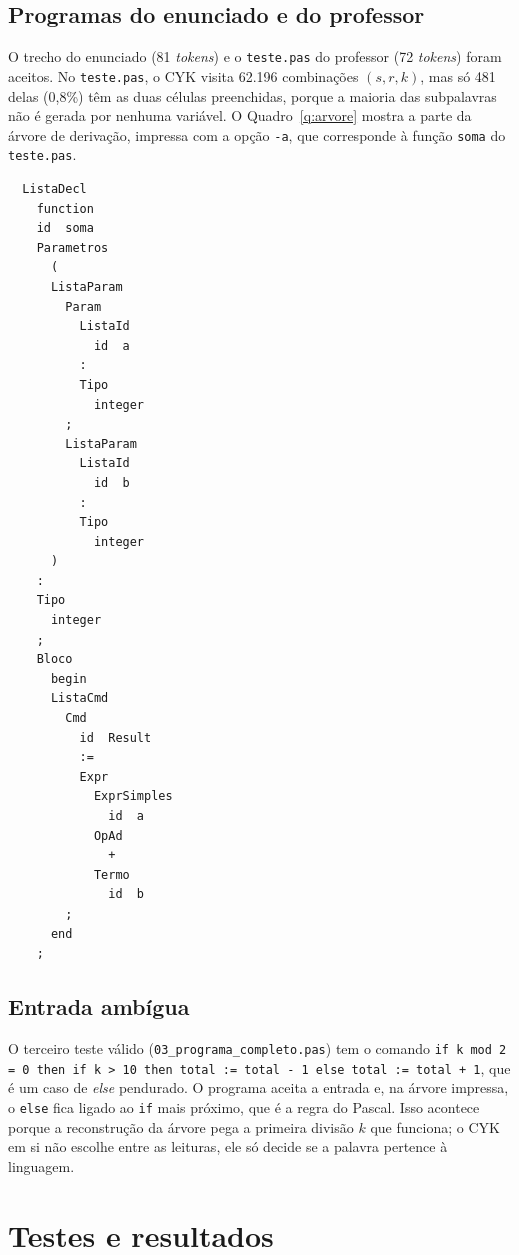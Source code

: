 \documentclass[12pt,a4paper]{article}
\newcommand{\fonte}[1][Elaborado pelos autores (2026).]{%
  \par\vspace{3pt}{\footnotesize Fonte: #1}\par}
\newcommand{\code}[1]{\texttt{#1}}
\begin{document}
\subsection{Programas do enunciado e do professor}

O trecho do enunciado (81 \textit{tokens}) e o \code{teste.pas} do professor (72
\textit{tokens}) foram aceitos. No \code{teste.pas}, o CYK visita 62.196 combinações
$(s, r, k)$, mas só 481 delas (0,8\%) têm as duas células preenchidas, porque a maioria das
subpalavras não é gerada por nenhuma variável. O Quadro~\ref{q:arvore} mostra a parte da árvore
de derivação, impressa com a opção \code{-a}, que corresponde à função \code{soma} do
\code{teste.pas}.

\begin{quadro}[htbp]
\caption{Árvore de derivação da função \code{soma} do \code{teste.pas} (opção \code{-a})}\label{q:arvore}
\begin{lstlisting}
  ListaDecl
    function
    id  soma
    Parametros
      (
      ListaParam
        Param
          ListaId
            id  a
          :
          Tipo
            integer
        ;
        ListaParam
          ListaId
            id  b
          :
          Tipo
            integer
      )
    :
    Tipo
      integer
    ;
    Bloco
      begin
      ListaCmd
        Cmd
          id  Result
          :=
          Expr
            ExprSimples
              id  a
            OpAd
              +
            Termo
              id  b
        ;
      end
    ;
\end{lstlisting}
\fonte
\end{quadro}

\subsection{Entrada ambígua}\label{s:ambiguidade}

O terceiro teste válido (\code{03\_programa\_completo.pas}) tem o comando
\code{if k mod 2 = 0 then if k > 10 then total := total - 1 else total := total + 1}, que é um
caso de \textit{else} pendurado. O programa aceita a entrada e, na árvore impressa, o
\code{else} fica ligado ao \code{if} mais próximo, que é a regra do Pascal. Isso acontece porque
a reconstrução da árvore pega a primeira divisão $k$ que funciona; o CYK em si não escolhe entre
as leituras, ele só decide se a palavra pertence à linguagem.

\section{Testes e resultados}\label{s:testes}
\end{document}

